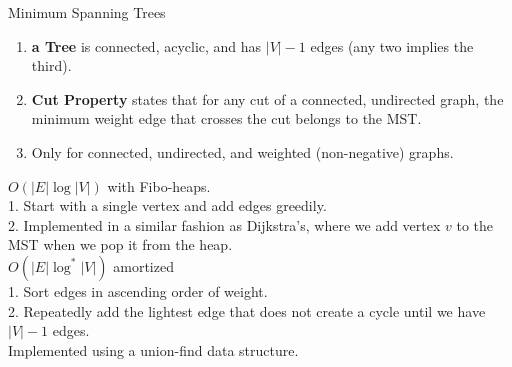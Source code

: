 \documentclass[10pt,a4paper]{article}
\begin{document}
\begin{multicols}{3}
\begin{textbox}{Minimum Spanning Trees}
    \begin{enumerate}
        \item {\bf a Tree} is connected, acyclic, and has $|V|-1$ edges (any two implies the third).
        \item {\bf Cut Property} states that for any cut of a connected, undirected graph, the minimum weight edge that crosses the cut belongs to the MST.
        \item Only for connected, undirected, and weighted (non-negative) graphs.
    \end{enumerate}
       $O(|E| \log |V|)$ with Fibo-heaps.\\
    1. Start with a single vertex and add edges greedily.\\
    2. Implemented in a similar fashion as Dijkstra’s, where we add vertex $v$ to the MST when we pop it from the heap.\\
    \linebreak
      $O(|E|\log^*{|V|})$ amortized\\
    1. Sort edges in ascending order of weight. \\
    2. Repeatedly add the lightest edge that does not create a cycle until we have $|V|-1$ edges.\\
    \linebreak
     Implemented using a union-find data structure.
\end{textbox}



\end{multicols}
\end{document}
